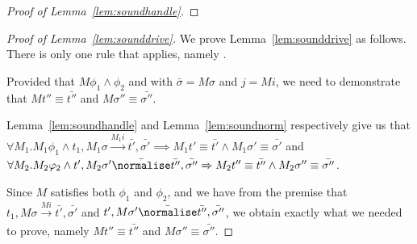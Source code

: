 \begin{proof}[Proof of Lemma~\ref{lem:soundhandle}]
  {

  }
\end{proof}



\begin{proof}[Proof of Lemma~\ref{lem:sounddrive}]
  We prove Lemma~\ref{lem:sounddrive} as follows.
  There is only one rule that applies, namely .

  Provided that $M\phi_1\land\phi_2$ and  with $\bar{\sigma}=M\sigma$ and $j=M i$,
  we need to demonstrate that $M t'' \equiv \bar{t''}$ and $M\sigma''\equiv \bar{\sigma''}$.


  Lemma~\ref{lem:soundhandle} and Lemma~\ref{lem:soundnorm} respectively give us that\\
$\forall M_1 . M_1 \phi_1 \land t_1,M_1\sigma \xrightarrow[]{M_1 i} \bar{t'},\bar{\sigma'}\implies M_1 t'\equiv\bar{t'}\land M_1\sigma' \equiv \bar{\sigma'}$ and \\
$\forall M_2 . M_2 \phi_2 \land t',M_2\sigma' \bar{\normalise} \bar{t''},\bar{\sigma''}\implies M_2 t''\equiv\bar{t''}\land M_2\sigma'' \equiv \bar{\sigma''}$.

Since $M$ satisfies both $\phi_1$ and $\phi_2$, and we have from the premise that
$t_1,M\sigma \xrightarrow[]{M i} \bar{t'},\bar{\sigma'}$ and
$t',M\sigma' \bar{\normalise} \bar{t''},\bar{\sigma''}$,
we obtain exactly what we needed to prove,
namely $M t'' \equiv \bar{t''}$ and $M\sigma''\equiv \bar{\sigma''}$.

\end{proof}
